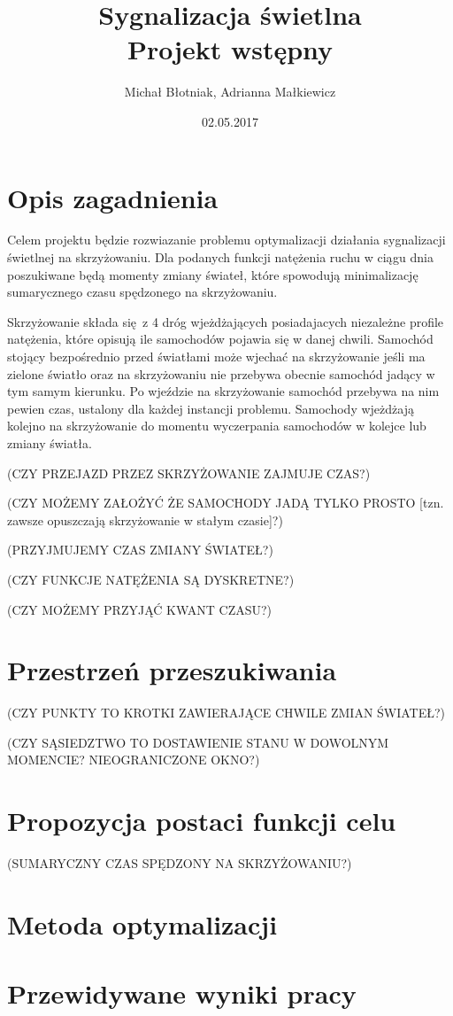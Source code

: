 \documentclass[a4paper]{article}
\title {
  Sygnalizacja świetlna
  \\ Projekt wstępny
}
\date{02.05.2017}
\author{Michał Błotniak, Adrianna Małkiewicz}
\begin{document}
\maketitle

\justify

\section{Opis zagadnienia}

Celem projektu będzie rozwiazanie problemu optymalizacji działania sygnalizacji
świetlnej na skrzyżowaniu. Dla podanych funkcji natężenia ruchu w ciągu dnia
poszukiwane będą momenty zmiany świateł, które spowodują minimalizację
sumarycznego czasu spędzonego na skrzyżowaniu.

Skrzyżowanie składa się z 4 dróg wjeżdżających posiadajacych niezależne profile
natężenia, które opisują ile samochodów pojawia się w danej chwili. Samochód
stojący bezpośrednio przed światłami może wjechać na skrzyżowanie jeśli ma zielone
światło oraz na skrzyżowaniu nie przebywa obecnie samochód jadący w tym samym
kierunku. Po wjeździe na skrzyżowanie samochód przebywa na nim pewien czas,
ustalony dla każdej instancji problemu. Samochody wjeżdżają kolejno na
skrzyżowanie do momentu wyczerpania samochodów w kolejce lub zmiany światła.

(CZY PRZEJAZD PRZEZ SKRZYŻOWANIE ZAJMUJE CZAS?)

(CZY MOŻEMY ZAŁOŻYĆ ŻE SAMOCHODY JADĄ TYLKO PROSTO [tzn. zawsze opuszczają skrzyżowanie w stałym czasie]?)

(PRZYJMUJEMY CZAS ZMIANY ŚWIATEŁ?)

(CZY FUNKCJE NATĘŻENIA SĄ DYSKRETNE?)

(CZY MOŻEMY PRZYJĄĆ KWANT CZASU?)

\section{Przestrzeń przeszukiwania}
(CZY PUNKTY TO KROTKI ZAWIERAJĄCE CHWILE ZMIAN ŚWIATEŁ?)

(CZY SĄSIEDZTWO TO DOSTAWIENIE STANU W DOWOLNYM MOMENCIE? NIEOGRANICZONE OKNO?)

\section{Propozycja postaci funkcji celu}
(SUMARYCZNY CZAS SPĘDZONY NA SKRZYŻOWANIU?)

\section{Metoda optymalizacji}

\section{Przewidywane wyniki pracy}
\end{document}
